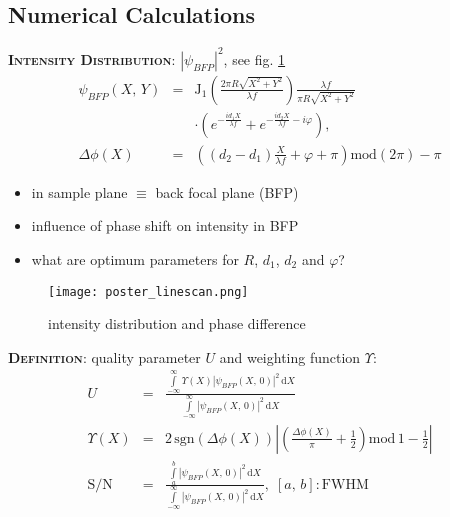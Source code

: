 \documentclass[portrait]{sciposter}
\begin{document}
\begin{multicols}{3}

\section{Numerical Calculations}

\textbf{\scshape Intensity Distribution}: $|\psi_{BFP}|^2$, see fig. \ref{fig_linescan}
\begin{eqnarray}
\psi_{BFP}(X,\,Y) &=& \mathrm{J}_1\left(\frac{2\pi R\sqrt{X^2+Y^2}}{\lambda f}\right)\frac{\lambda f}{\pi R\sqrt{X^2+Y^2}} \nonumber \\
&& \cdot\left( e^{-\frac{id_1X}{\lambda f}}+e^{-\frac{id_2X}{\lambda f}-i\varphi}\right),\nonumber \\
\Delta\phi(X) &=& \left((d_2-d_1)\frac{X}{\lambda f}+\varphi+\pi\right)\mathrm{mod}(2\pi)-\pi \nonumber
\end{eqnarray}

\begin{itemize}
\item in sample plane $\equiv$ back focal plane (BFP)
\item influence of phase shift on intensity in BFP
\item what are optimum parameters for $R$, $d_1$, $d_2$ and $\varphi$?
\end{itemize}

\begin{figure}[h]
\texttt{[image: poster\_linescan.png]}
\caption{intensity distribution and phase difference}
\label{fig_linescan}
\end{figure}


\textbf{\scshape Definition}: quality parameter $U$ and weighting function $\Upsilon$:
\begin{eqnarray}
\label{eqn_usignal}
U &=& \frac{\int\limits_{-\infty}^\infty\Upsilon(X)|\psi_{BFP}(X,\,0)|^2\,\mathrm{d}X}{\int\limits_{-\infty}^\infty|\psi_{BFP}(X,\,0)|^2\,\mathrm{d}X} \nonumber\\
\label{eqn_upsilon_1}
\Upsilon(X) &=& 2\,\mathrm{sgn}\left(\Delta\phi(X)\right)\left|\left(\frac{\Delta\phi(X)}{\pi}+\frac{1}{2}\right)\mathrm{mod}\,1-\frac{1}{2}\right| \nonumber\\
\label{eqn_sn}
\mathrm{S/N} &=& \frac{\int\limits_a^b|\psi_{BFP}(X,\,0)|^2\,\mathrm{d}X}{\int\limits_{-\infty}^\infty|\psi_{BFP}(X,\,0)|^2\,\mathrm{d}X},\;[a,\,b]: \mathrm{FWHM} \nonumber
\end{eqnarray}


\end{multicols}
\end{document}
